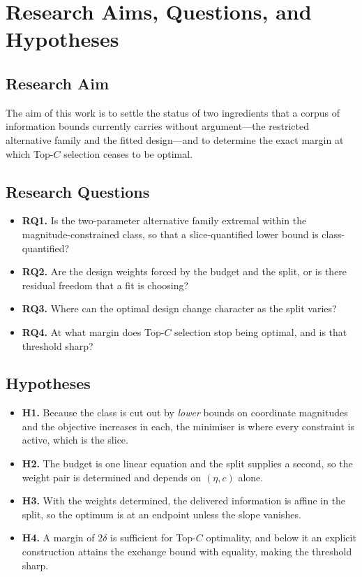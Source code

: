 \section{Research Aims, Questions, and Hypotheses}

\subsection{Research Aim}

The aim of this work is to settle the status of two ingredients that a corpus of information
bounds currently carries without argument---the restricted alternative family and the fitted
design---and to determine the exact margin at which Top-$C$ selection ceases to be optimal.

\subsection{Research Questions}

\begin{itemize}
\item \textbf{RQ1.} Is the two-parameter alternative family extremal within the
magnitude-constrained class, so that a slice-quantified lower bound is class-quantified?
\item \textbf{RQ2.} Are the design weights forced by the budget and the split, or is there
residual freedom that a fit is choosing?
\item \textbf{RQ3.} Where can the optimal design change character as the split varies?
\item \textbf{RQ4.} At what margin does Top-$C$ selection stop being optimal, and is that
threshold sharp?
\end{itemize}

\subsection{Hypotheses}

\begin{itemize}
\item \textbf{H1.} Because the class is cut out by \emph{lower} bounds on coordinate
magnitudes and the objective increases in each, the minimiser is where every constraint is
active, which is the slice.
\item \textbf{H2.} The budget is one linear equation and the split supplies a second, so the
weight pair is determined and depends on $(\eta,c)$ alone.
\item \textbf{H3.} With the weights determined, the delivered information is affine in the
split, so the optimum is at an endpoint unless the slope vanishes.
\item \textbf{H4.} A margin of $2\delta$ is sufficient for Top-$C$ optimality, and below it
an explicit construction attains the exchange bound with equality, making the threshold
sharp.
\end{itemize}

